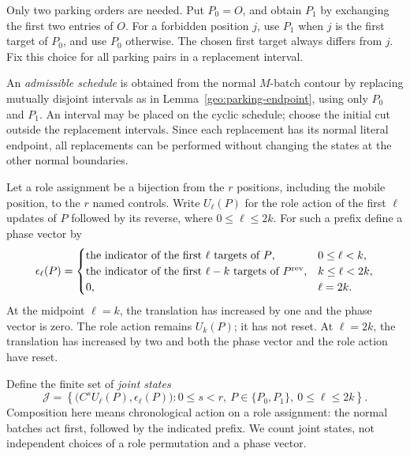 Only two parking orders are needed. Put $P_0=O$, and obtain $P_1$ by
exchanging the first two entries of $O$. For a forbidden position $j$,
use $P_1$ when $j$ is the first target of $P_0$, and use $P_0$ otherwise.
The chosen first target always differs from $j$. Fix this choice for all
parking pairs in a replacement interval.

An \emph{admissible schedule} is obtained from the normal $M$-batch
contour by replacing mutually disjoint intervals as in
Lemma~\ref{geo:parking-endpoint}, using only $P_0$ and $P_1$. An interval
may be placed on the cyclic schedule; choose the initial cut outside the
replacement intervals. Since each replacement has its normal literal
endpoint, all replacements can be performed without changing the states
at the other normal boundaries.

Let a role assignment be a bijection from the $r$ positions, including
the mobile position, to the $r$ named controls. Write $U_\ell(P)$ for the
role action of the first $\ell$ updates of $P$ followed by its reverse,
where $0\leq\ell\leq 2k$. For such a prefix define a phase vector by
\[
 \epsilon_\ell(P)=
 \begin{cases}
  \text{the indicator of the first $\ell$ targets of $P$},&0\leq\ell<k,\\
  \text{the indicator of the first $\ell-k$ targets of $P^{\rm rev}$},
       &k\leq\ell<2k,\\
  0,&\ell=2k.
 \end{cases}
\]
At the midpoint $\ell=k$, the translation has increased by one and the
phase vector is zero. The role action remains $U_k(P)$; it has not reset.
At $\ell=2k$, the translation has increased by two and both the phase
vector and the role action have reset.

Define the finite set of \emph{joint states}
\begin{equation}
 \mathcal J=
 \left\{\bigl(C^sU_\ell(P),\epsilon_\ell(P)\bigr):
      0\leq s<r,\ P\in\{P_0,P_1\},\ 0\leq\ell\leq2k\right\}.
 \label{geo:joint-set}
\end{equation}
Composition here means chronological action on a role assignment: the
normal batches act first, followed by the indicated prefix. We count
joint states, not independent choices of a role permutation and a phase
vector.

